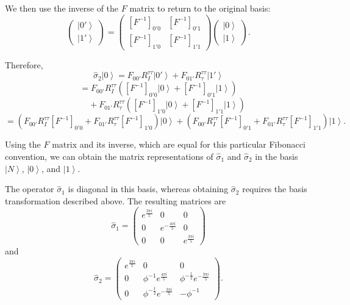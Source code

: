 \documentclass[11pt]{article}
\begin{document}
	We then use the inverse of the $F$ matrix to return to the original basis:
	\[
	\begin{pmatrix}
		\left| 0' \right\rangle\\
		\left| 1' \right\rangle 
	\end{pmatrix}
	=
	\begin{pmatrix}
		[F^{-1}]_{0'0} & [F^{-1}]_{0'1} \\
		[F^{-1}]_{1'0} & [F^{-1}]_{1'1}
	\end{pmatrix}
	\begin{pmatrix}
		\left| 0 \right\rangle\\
		\left| 1 \right\rangle 
	\end{pmatrix}.
	\]
	
	Therefore,
	\[
	\hat{\sigma}_{2}\left|0\right\rangle
	=
	F_{00'}R^{\tau\tau}_{I}\left|0'\right\rangle
	+
	F_{01'}R^{\tau\tau}_{\tau}\left|1'\right\rangle
	\]
	\[
	=
	F_{00'}R^{\tau\tau}_{I}
	\left(
	[F^{-1}]_{0'0}\left|0\right\rangle
	+
	[F^{-1}]_{0'1}\left|1\right\rangle
	\right)
	\]
	\[
	\qquad
	+
	F_{01'}R^{\tau\tau}_{\tau}
	\left(
	[F^{-1}]_{1'0}\left|0\right\rangle
	+
	[F^{-1}]_{1'1}\left|1\right\rangle
	\right)
	\]
	\[
	=
	\left(
	F_{00'}R^{\tau\tau}_{I}[F^{-1}]_{0'0}
	+
	F_{01'}R^{\tau\tau}_{\tau}[F^{-1}]_{1'0}
	\right)
	\left|0\right\rangle
	+
	\left(
	F_{00'}R^{\tau\tau}_{I}[F^{-1}]_{0'1}
	+
	F_{01'}R^{\tau\tau}_{\tau}[F^{-1}]_{1'1}
	\right)
	\left|1\right\rangle.
	\]
	
	Using the $F$ matrix and its inverse, which are equal for this particular Fibonacci convention, we can obtain the matrix representations of $\hat{\sigma}_{1}$ and $\hat{\sigma}_{2}$ in the basis
	$\left|N\right\rangle$, $\left|0\right\rangle$, and $\left|1\right\rangle$.
	
	The operator $\hat{\sigma}_{1}$ is diagonal in this basis, whereas obtaining $\hat{\sigma}_{2}$ requires the basis transformation described above. The resulting matrices are
	\[
	\hat{\sigma}_{1}
	=
	\begin{pmatrix}
		e^{\frac{3 \pi i}{5}} & 0 & 0 \\
		0 & e^{-\frac{4 \pi i}{5}} & 0 \\
		0 & 0 & e^{\frac{3 \pi i}{5}}
	\end{pmatrix}
	\]
	and
	\[
	\hat{\sigma}_{2}
	=
	\begin{pmatrix}
		e^{\frac{3 \pi i}{5}} & 0 & 0 \\
		0 & \phi^{-1}e^{\frac{4 \pi i}{5}}
		& \phi^{-\frac{1}{2}}e^{-\frac{3 \pi i}{5}} \\
		0 & \phi^{-\frac{1}{2}}e^{-\frac{3 \pi i}{5}}
		& -\phi^{-1}
	\end{pmatrix}.
	\]
	
\end{document}
